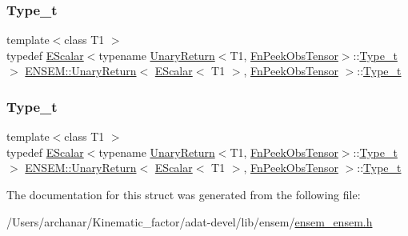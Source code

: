 \subsubsection{\texorpdfstring{Type\_t}{Type\_t}\hspace{0.1cm}{\footnotesize\ttfamily [2/3]}}
{\footnotesize\ttfamily template$<$class T1 $>$ \\
typedef \mbox{\hyperlink{classENSEM_1_1EScalar}{E\+Scalar}}$<$typename \mbox{\hyperlink{structENSEM_1_1UnaryReturn}{Unary\+Return}}$<$T1, \mbox{\hyperlink{structENSEM_1_1FnPeekObsTensor}{Fn\+Peek\+Obs\+Tensor}}$>$\+::\mbox{\hyperlink{structENSEM_1_1UnaryReturn_3_01EScalar_3_01T1_01_4_00_01FnPeekObsTensor_01_4_aebe42fb1bfefa3588cabc7286faabe45}{Type\+\_\+t}}$>$ \mbox{\hyperlink{structENSEM_1_1UnaryReturn}{E\+N\+S\+E\+M\+::\+Unary\+Return}}$<$ \mbox{\hyperlink{classENSEM_1_1EScalar}{E\+Scalar}}$<$ T1 $>$, \mbox{\hyperlink{structENSEM_1_1FnPeekObsTensor}{Fn\+Peek\+Obs\+Tensor}} $>$\+::\mbox{\hyperlink{structENSEM_1_1UnaryReturn_3_01EScalar_3_01T1_01_4_00_01FnPeekObsTensor_01_4_aebe42fb1bfefa3588cabc7286faabe45}{Type\+\_\+t}}}

\mbox{\label{structENSEM_1_1UnaryReturn_3_01EScalar_3_01T1_01_4_00_01FnPeekObsTensor_01_4_aebe42fb1bfefa3588cabc7286faabe45}} 
\subsubsection{\texorpdfstring{Type\_t}{Type\_t}\hspace{0.1cm}{\footnotesize\ttfamily [3/3]}}
{\footnotesize\ttfamily template$<$class T1 $>$ \\
typedef \mbox{\hyperlink{classENSEM_1_1EScalar}{E\+Scalar}}$<$typename \mbox{\hyperlink{structENSEM_1_1UnaryReturn}{Unary\+Return}}$<$T1, \mbox{\hyperlink{structENSEM_1_1FnPeekObsTensor}{Fn\+Peek\+Obs\+Tensor}}$>$\+::\mbox{\hyperlink{structENSEM_1_1UnaryReturn_3_01EScalar_3_01T1_01_4_00_01FnPeekObsTensor_01_4_aebe42fb1bfefa3588cabc7286faabe45}{Type\+\_\+t}}$>$ \mbox{\hyperlink{structENSEM_1_1UnaryReturn}{E\+N\+S\+E\+M\+::\+Unary\+Return}}$<$ \mbox{\hyperlink{classENSEM_1_1EScalar}{E\+Scalar}}$<$ T1 $>$, \mbox{\hyperlink{structENSEM_1_1FnPeekObsTensor}{Fn\+Peek\+Obs\+Tensor}} $>$\+::\mbox{\hyperlink{structENSEM_1_1UnaryReturn_3_01EScalar_3_01T1_01_4_00_01FnPeekObsTensor_01_4_aebe42fb1bfefa3588cabc7286faabe45}{Type\+\_\+t}}}



The documentation for this struct was generated from the following file\+:\begin{DoxyCompactItemize}
\item 
/\+Users/archanar/\+Kinematic\+\_\+factor/adat-\/devel/lib/ensem/\mbox{\hyperlink{adat-devel_2lib_2ensem_2ensem__ensem_8h}{ensem\+\_\+ensem.\+h}}\end{DoxyCompactItemize}
